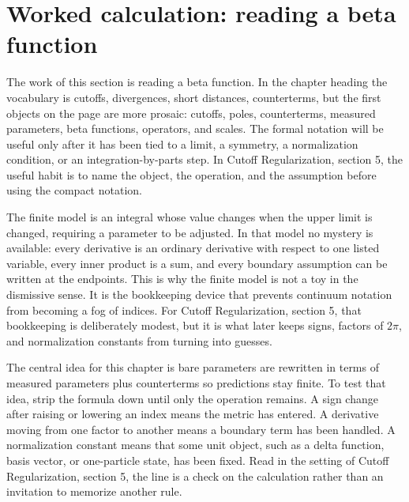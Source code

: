 \section{Worked calculation: reading a beta function}













The work of this section is reading a beta function.  In the chapter heading the vocabulary is cutoffs, divergences, short distances, counterterms, but the first objects on the page are more prosaic: cutoffs, poles, counterterms, measured parameters, beta functions, operators, and scales.  The formal notation will be useful only after it has been tied to a limit, a symmetry, a normalization condition, or an integration-by-parts step.  In Cutoff Regularization, section 5, the useful habit is to name the object, the operation, and the assumption before using the compact notation.

The finite model is an integral whose value changes when the upper limit is changed, requiring a parameter to be adjusted.  In that model no mystery is available: every derivative is an ordinary derivative with respect to one listed variable, every inner product is a sum, and every boundary assumption can be written at the endpoints.  This is why the finite model is not a toy in the dismissive sense.  It is the bookkeeping device that prevents continuum notation from becoming a fog of indices.  For Cutoff Regularization, section 5, that bookkeeping is deliberately modest, but it is what later keeps signs, factors of \(2\pi\), and normalization constants from turning into guesses.

The central idea for this chapter is bare parameters are rewritten in terms of measured parameters plus counterterms so predictions stay finite.  To test that idea, strip the formula down until only the operation remains.  A sign change after raising or lowering an index means the metric has entered.  A derivative moving from one factor to another means a boundary term has been handled.  A normalization constant means that some unit object, such as a delta function, basis vector, or one-particle state, has been fixed.  Read in the setting of Cutoff Regularization, section 5, the line is a check on the calculation rather than an invitation to memorize another rule.

